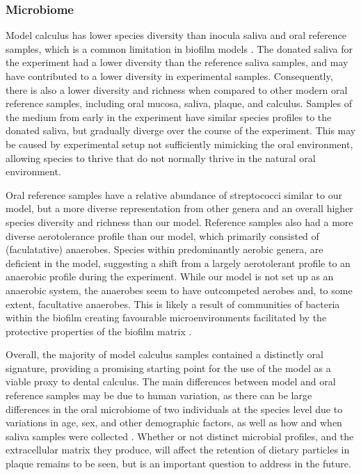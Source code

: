 \documentclass[10pt,a4paper]{article}
\begin{document}
\subsubsection{Microbiome}\label{microbiome}

Model calculus has lower species diversity than inocula saliva and oral
reference samples, which is a common limitation in biofilm models
\citep{edlundBiofilmModel2013, bjarnsholtVivoBiofilm2013}. The donated
saliva for the experiment had a lower diversity than the reference
saliva samples, and may have contributed to a lower diversity in
experimental samples. Consequently, there is also a lower diversity and
richness when compared to other modern oral reference samples, including
oral mucosa, saliva, plaque, and calculus. Samples of the medium from
early in the experiment have similar species profiles to the donated
saliva, but gradually diverge over the course of the experiment. This
may be caused by experimental setup not sufficiently mimicking the oral
environment, allowing species to thrive that do not normally thrive in
the natural oral environment.

Oral reference samples have a relative abundance of streptococci similar
to our model, but a more diverse representation from other genera and an
overall higher species diversity and richness than our model. Reference
samples also had a more diverse aerotolerance profile than our model,
which primarily consisted of (faculatative) anaerobes. Species within
predominantly aerobic genera, are deficient in the model, suggesting a
shift from a largely aerotolerant profile to an anaerobic profile during
the experiment. While our model is not set up as an anaerobic system,
the anaerobes seem to have outcompeted aerobes and, to some extent,
facultative anaerobes. This is likely a result of communities of
bacteria within the biofilm creating favourable microenvironments
facilitated by the protective properties of the biofilm matrix
\citep{flemmingBiofilmsEmergent2016, edlundUncoveringComplex2018}.

Overall, the majority of model calculus samples contained a distinctly
oral signature, providing a promising starting point for the use of the
model as a viable proxy to dental calculus. The main differences between
model and oral reference samples may be due to human variation, as there
can be large differences in the oral microbiome of two individuals at
the species level due to variations in age, sex, and other demographic
factors, as well as how and when saliva samples were collected
\citep{burchamPatternsOral2020, nearingAssessingVariation2020}. Whether
or not distinct microbial profiles, and the extracellular matrix they
produce, will affect the retention of dietary particles in plaque
remains to be seen, but is an important question to address in the
future.
\end{document}
